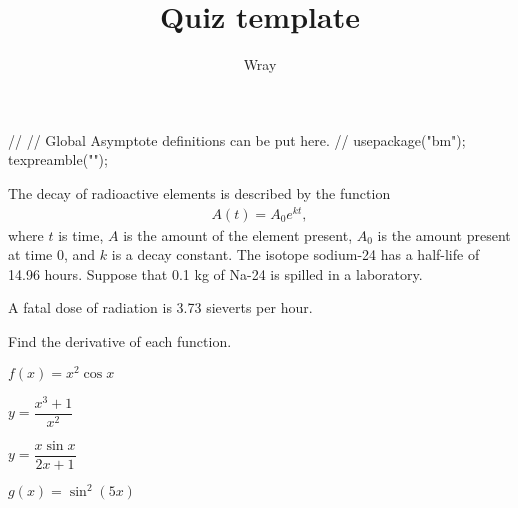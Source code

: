 \documentclass[addpoints, 12pt]{exam}
\title{Quiz template}
\author{Wray}
\begin{document}
\begin{asydef}
//
// Global Asymptote definitions can be put here.
//
usepackage("bm");
texpreamble("\def\V#1{\bm{#1}}");
\end{asydef}



\bigskip

             
\bigskip
\bigskip
The decay of radioactive elements is described by the function
\begin{align*}
	A(t) = A_0 e^{kt},
\end{align*}
where $t$ is time, $A$ is the amount of the element present, $A_0$ is the amount present at time 0, and $k$ is a decay constant.  The isotope sodium-24 has a half-life of 14.96 hours.  Suppose that 0.1 kg of Na-24 is spilled in a laboratory.  

A fatal dose of radiation is 3.73 sieverts per hour.

Find the derivative of each function.  

\begin{questions}

\question[5]
$f(x) = x^2 \cos x$

\question[5]
$y = \dfrac{x^3 + 1}{x^2}$

\clearpage

\question[5]
$y = \dfrac{x \sin x}{2x + 1}$

\question[5]
$g(x) = \sin^2 \left( 5x \right)$

\end{questions}
\end{document}
